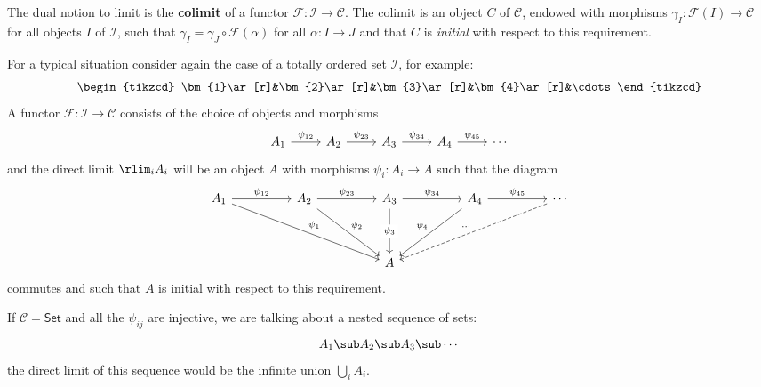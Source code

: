 The dual notion to limit is the \textbf{colimit} of a functor $\mathscr{F}:\mathcal{I}\to\mathcal{C}$. The colimit is an object $C$ of $\mathcal{C}$, endowed with morphisms $\gamma_I:\mathscr{F}(I)\to\mathcal{C}$ for all objects $I$ of $\mathcal{I}$, such that $\gamma_I=\gamma_J\circ\mathscr{F}(\alpha)$ for all $\alpha:I\to J$ and that $C$ is \textit{initial} with respect to this requirement.\par
\begin{example}

For a typical situation consider again the case of a totally ordered set $\mathcal{I}$, for example:
\[\begin{tikzcd}
\bm{1}\ar[r]&\bm{2}\ar[r]&\bm{3}\ar[r]&\bm{4}\ar[r]&\cdots
\end{tikzcd}\]
A functor $\mathscr{F}:\mathcal{I}\to\mathcal{C}$ consists of the choice of objects and morphisms
\[\begin{tikzcd}
A_1\ar[r,"\psi_{12}"]&A_2\ar[r,"\psi_{23}"]&A_3\ar[r,"\psi_{34}"]&A_4\ar[r,"\psi_{45}"]&\cdots
\end{tikzcd}\]
and the direct limit $\rlim_iA_i$ will be an object $A$ with morphisms $\psi_i:A_i\to A$ such
that the diagram
\[\begin{tikzcd}
A_1\ar[rrrrdd,"\psi_1"]\ar[rr,"\psi_{12}"]&&A_2\ar[rr,"\psi_{23}"]\ar[rrdd,"\psi_2"]&&A_3\ar[dd,"\psi_3" description]\ar[rr,"\psi_{34}"]&&A_4\ar[rr,"\psi_{45}"]\ar[lldd,swap,"\psi_4"]&&\cdots\ar[lllldd,dashed,swap,"\cdots"]\\
&&&&\\
&&&&A&&&&
\end{tikzcd}\]
commutes and such that $A$ is initial with respect to this requirement.
\end{example}
\begin{example}
If $\mathcal{C }=\mathsf{Set}$ and all the $\psi_{ij}$ are injective, we are talking about a nested sequence of sets:
\[A_1\sub A_2\sub A_3\sub\cdots\]
the direct limit of this sequence would be the infinite union $\bigcup_iA_i$.
\end{example}
